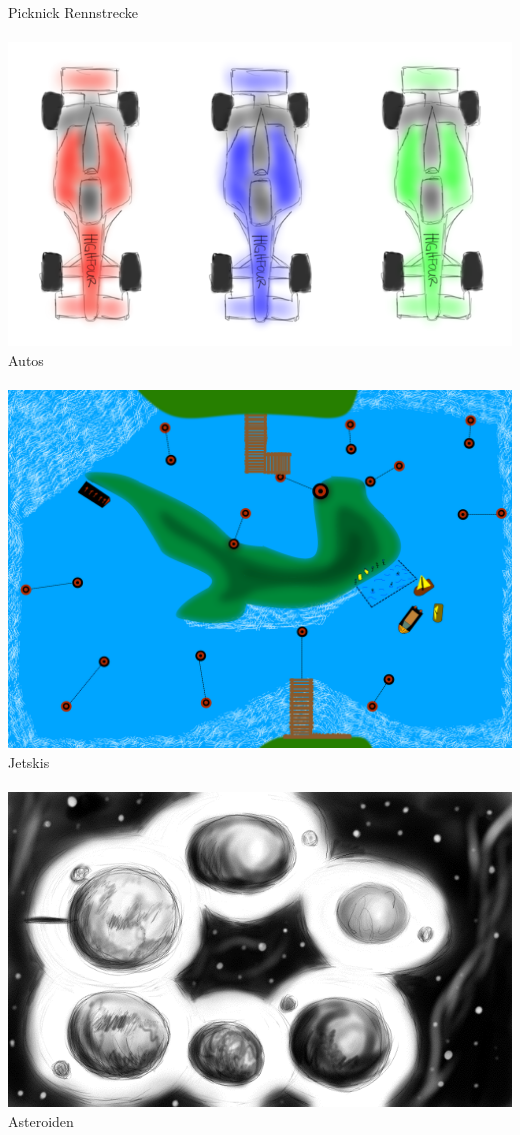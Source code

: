 Picknick Rennstrecke\\
\\
\includegraphics[width=1\textwidth]{img/autos.png}
Autos\\
\\
\includegraphics[width=1\textwidth]{img/wasserkurs.png}
Jetskis\\
\\
\includegraphics[width=1\textwidth]{img/asteroiden.png}
Asteroiden\\
\\
